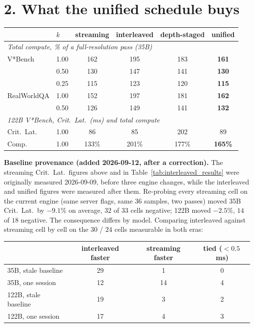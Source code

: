 \documentclass[10pt]{article}
\newcommand{\hh}[1]{\textbf{#1}}
\begin{document}
\section*{2. What the unified schedule buys}

\begin{table}[h]\centering\small
\begin{tabular}{llcccc}
\toprule
 & $k$ & streaming & interleaved & depth-staged & \hh{unified} \\
\midrule
\multicolumn{6}{l}{\emph{Total compute, \% of a full-resolution pass (35B)}}\\
V*Bench     & 1.00 & 162 & 195 & 183 & \hh{161} \\
            & 0.50 & 130 & 147 & 141 & \hh{130} \\
            & 0.25 & 115 & 123 & 120 & \hh{115} \\
RealWorldQA & 1.00 & 152 & 197 & 181 & \hh{162} \\
            & 0.50 & 126 & 149 & 141 & \hh{132} \\
\midrule
\multicolumn{6}{l}{\emph{122B V*Bench, Crit.\ Lat.\ (ms) and total compute}}\\
Crit.\ Lat. & 1.00 & 86 & 85 & 202 & 89 \\
Comp.       & 1.00 & 133\% & 201\% & 177\% & \hh{165\%} \\
\bottomrule
\end{tabular}
\end{table}

\noindent\textbf{Baseline provenance (added 2026-09-12, after a correction).} The streaming
Crit.\ Lat.\ figures above and in Table~\ref{tab:interleaved_results} were originally measured
2026-09-09, before three engine changes, while the interleaved and unified figures were measured
after them. Re-probing every streaming cell on the current engine (same server flags, same
$36$ samples, two passes) moved 35B Crit.\ Lat.\ by $-9.1\%$ on average, $32$ of $33$ cells
negative; 122B moved $-2.5\%$, $14$ of $18$ negative. The consequence differs by model. Comparing
interleaved against streaming cell by cell on the $30$ / $24$ cells measurable in both eras:

\begin{center}\small
\begin{tabular}{lccc}
\toprule
 & interleaved faster & streaming faster & tied ($<0.5$\,ms) \\
\midrule
35B, stale baseline & 29 & 1 & 0 \\
35B, one session    & 12 & 14 & 4 \\
122B, stale baseline & 19 & 3 & 2 \\
122B, one session    & 17 & 4 & 3 \\
\bottomrule
\end{tabular}
\end{center}
\end{document}
